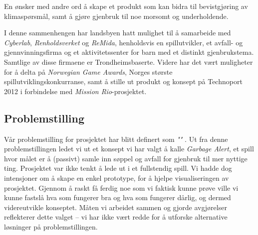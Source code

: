 En ønsker med andre ord å skape et
produkt som kan bidra til bevistgjøring av klimaspørsmål, samt å gjøre
gjenbruk til noe morsomt og underholdende.

I denne sammenhengen har landsbyen hatt mulighet til å samarbeide med
\emph{Cyberlab}, \emph{Renholdsverket} og \emph{ReMida}, henholdsvis en
spillutvikler, et avfall- og gjennvinningsfirma og et aktivitetssenter
for barn med et distinkt gjenbrukstema. Samtlige av disse firmaene er
Trondheimsbaserte. Videre har det vært muligheter for å delta på
\emph{Norwegian Game Awards}, Norges største spillutviklingskonkurranse,
samt å stille ut produkt og konsept på Technoport 2012 i forbindelse med
\emph{Mission Rio}-prosjektet.

\subsection{Problemstilling} Vår problemstilling for prosjektet har
blitt definert som \emph{""} . Ut fra denne
problemstillingen ledet vi ut et konsept vi har valgt å kalle
\emph{Garbage Alert}, et spill hvor målet er å (passivt) samle inn
søppel og avfall for gjenbruk til mer nyttige ting. Prosjektet var ikke
tenkt å lede ut i et fullstendig spill. Vi hadde dog intensjoner om å
skape en enkel prototype, for å hjelpe visualiseringen av prosjektet.
Gjennom å raskt få ferdig noe som vi faktisk kunne prøve ville vi kunne
fastslå hva som fungerer bra og hva som fungerer dårlig, og dermed
videreutvikle konseptet. Måten vi arbeidet sammen og gjorde avgjørelser
reflekterer dette valget – vi har ikke vært redde for å utforske
alternative løsninger på problemstillingen.
